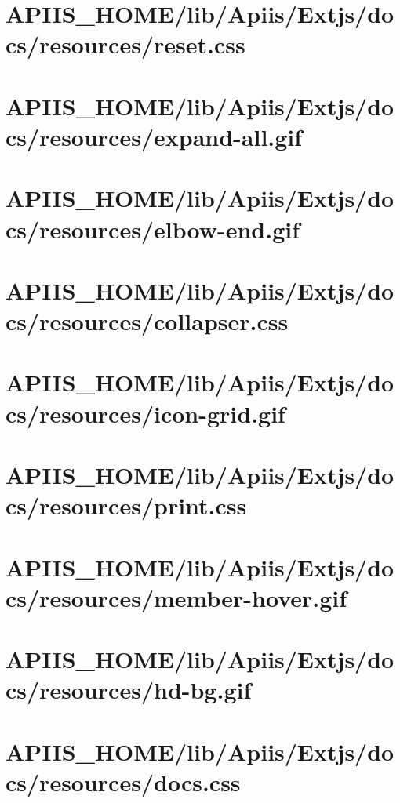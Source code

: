 \section{APIIS\_HOME/lib/Apiis/Extjs/docs/resources/reset.css} 
\section{APIIS\_HOME/lib/Apiis/Extjs/docs/resources/expand-all.gif} 
\section{APIIS\_HOME/lib/Apiis/Extjs/docs/resources/elbow-end.gif} 
\section{APIIS\_HOME/lib/Apiis/Extjs/docs/resources/collapser.css} 
\section{APIIS\_HOME/lib/Apiis/Extjs/docs/resources/icon-grid.gif} 
\section{APIIS\_HOME/lib/Apiis/Extjs/docs/resources/print.css} 
\section{APIIS\_HOME/lib/Apiis/Extjs/docs/resources/member-hover.gif} 
\section{APIIS\_HOME/lib/Apiis/Extjs/docs/resources/hd-bg.gif} 
\section{APIIS\_HOME/lib/Apiis/Extjs/docs/resources/docs.css} 
